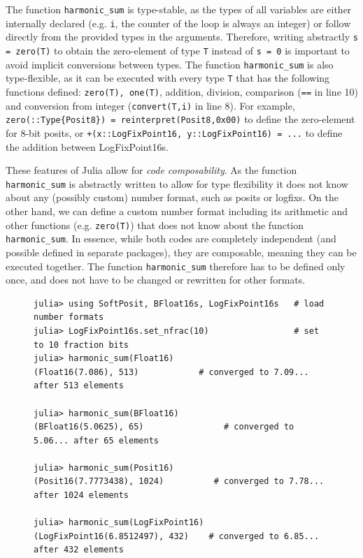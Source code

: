 The function \texttt{harmonic\_sum} is type-stable, as the types of all variables are either internally declared (e.g.
\texttt{i}, the counter of the loop is always an integer) or follow directly from the provided types in the arguments.
Therefore, writing abstractly \texttt{s = zero(T)} to obtain the zero-element of type \texttt{T} instead of \texttt{s = 0}
is important to avoid implicit conversions between types. The function \texttt{harmonic\_sum} is also type-flexible,
as it can be executed with every type \texttt{T} that has the following functions defined: \texttt{zero(T), one(T)}, addition,
division, comparison (\texttt{==} in line 10) and conversion from integer (\texttt{convert(T,i)} in line 8).
For example, \texttt{zero(::Type\{Posit8\}) = reinterpret(Posit8,0x00)} to define the zero-element for 8-bit posits, or
\texttt{+(x::LogFixPoint16, y::LogFixPoint16) = ...} to define the addition between LogFixPoint16s.

These features of Julia allow for \emph{code composability}. As the function \texttt{harmonic\_sum} is abstractly written
to allow for type flexibility it does not know about any (possibly custom) number format, such as posits or logfixs.
On the other hand, we can define a custom number format including its arithmetic and other functions
(e.g. \texttt{zero(T)}) that does not know about the function \texttt{harmonic\_sum}. In essence, while both codes
are completely independent (and possible defined in separate packages), they are composable, meaning they can
be executed together. The function \texttt{harmonic\_sum} therefore has to be defined only once, and does not have
to be  changed or rewritten for other formats.

\begin{figure}[tbhp]
\begin{lstlisting}[language=JuliaLocal, label=lst:harmonic_sum2, caption={\textbf{Executing \texttt{harmonic\_sum} with different
number formats in the Julia shell.} The number format is passed on as an argument, causing the function \texttt{harmonic\_sum}
to be compiled and executed with that format. Depending on the precision of the number format, the harmonic sum converges
after 65 (BFloat16) to 1024 elements (Posit16).}]
julia> using SoftPosit, BFloat16s, LogFixPoint16s   # load number formats
julia> LogFixPoint16s.set_nfrac(10)                 # set to 10 fraction bits
julia> harmonic_sum(Float16)
(Float16(7.086), 513)            # converged to 7.09... after 513 elements

julia> harmonic_sum(BFloat16)
(BFloat16(5.0625), 65)                # converged to 5.06... after 65 elements

julia> harmonic_sum(Posit16)
(Posit16(7.7773438), 1024)          # converged to 7.78... after 1024 elements

julia> harmonic_sum(LogFixPoint16)
(LogFixPoint16(6.8512497), 432)    # converged to 6.85... after 432 elements
\end{lstlisting}
\end{figure}

